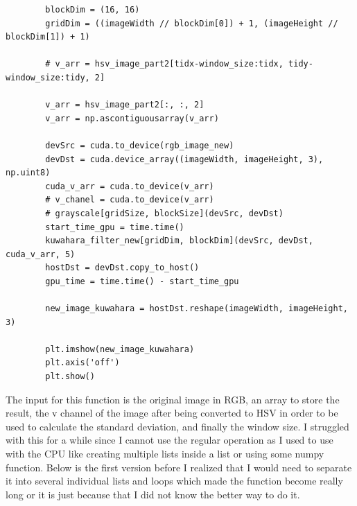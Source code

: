 \documentclass{article}
\begin{document}
\begin{verbatim}
		blockDim = (16, 16)
		gridDim = ((imageWidth // blockDim[0]) + 1, (imageHeight // blockDim[1]) + 1)
		
		# v_arr = hsv_image_part2[tidx-window_size:tidx, tidy-window_size:tidy, 2]
		
		v_arr = hsv_image_part2[:, :, 2]
		v_arr = np.ascontiguousarray(v_arr)
		
		devSrc = cuda.to_device(rgb_image_new)
		devDst = cuda.device_array((imageWidth, imageHeight, 3), np.uint8)
		cuda_v_arr = cuda.to_device(v_arr)
		# v_chanel = cuda.to_device(v_arr)
		# grayscale[gridSize, blockSize](devSrc, devDst)
		start_time_gpu = time.time()
		kuwahara_filter_new[gridDim, blockDim](devSrc, devDst, cuda_v_arr, 5)
		hostDst = devDst.copy_to_host()
		gpu_time = time.time() - start_time_gpu
		
		new_image_kuwahara = hostDst.reshape(imageWidth, imageHeight, 3)
		
		plt.imshow(new_image_kuwahara)
		plt.axis('off')
		plt.show()
	\end{verbatim}
	
	The input for this function is the original image in RGB, an array to store the result, the v channel of the image after being converted to HSV in order to be used to calculate the standard deviation, and finally the window size. I struggled with this for a while since I cannot use the regular operation as I used to use with the CPU like creating multiple lists inside a list or using some numpy function. Below is the first version before I realized that I would need to separate it into several individual lists and loops which made the function become really long or it is just because that I did not know the better way to do it. 
	
\end{document}
